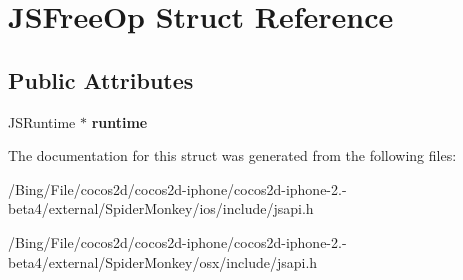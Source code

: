 \hypertarget{struct_j_s_free_op}{\section{J\-S\-Free\-Op Struct Reference}
\label{struct_j_s_free_op}
}
\subsection*{Public Attributes}
\begin{DoxyCompactItemize}
\item 
\hypertarget{struct_j_s_free_op_ae8845c2be28411fc65b1143c045d0014}{J\-S\-Runtime $\ast$ {\bfseries runtime}}\label{struct_j_s_free_op_ae8845c2be28411fc65b1143c045d0014}

\end{DoxyCompactItemize}


The documentation for this struct was generated from the following files\-:\begin{DoxyCompactItemize}
\item 
/\-Bing/\-File/cocos2d/cocos2d-\/iphone/cocos2d-\/iphone-\/2.-\/beta4/external/\-Spider\-Monkey/ios/include/jsapi.\-h\item 
/\-Bing/\-File/cocos2d/cocos2d-\/iphone/cocos2d-\/iphone-\/2.-\/beta4/external/\-Spider\-Monkey/osx/include/jsapi.\-h\end{DoxyCompactItemize}
